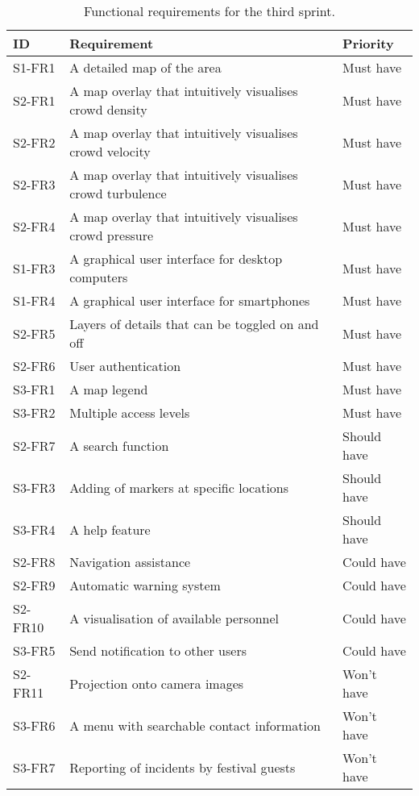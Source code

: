\begin{table}[h!]
	\centering
	\begin{tabularx}{\textwidth}{lXl}
		\toprule
		\textbf{ID} & \textbf{Requirement} & \textbf{Priority} \\
		\midrule 
		\rowcolor[HTML]{EFEFEF} 
		S1-FR1 & A detailed map of the area & Must have \\
		S2-FR1 & A map overlay that intuitively visualises crowd density & Must have \\
		\rowcolor[HTML]{EFEFEF} 
		S2-FR2 & A map overlay that intuitively visualises crowd velocity & Must have \\
		S2-FR3 & A map overlay that intuitively visualises crowd turbulence & Must have \\
		\rowcolor[HTML]{EFEFEF} 
		S2-FR4 & A map overlay that intuitively visualises crowd pressure & Must have \\
		S1-FR3 & A graphical user interface for desktop computers & Must have \\
		\rowcolor[HTML]{EFEFEF} 
		S1-FR4 & A graphical user interface for smartphones & Must have \\
		S2-FR5 & Layers of details that can be toggled on and off & Must have \\
		\rowcolor[HTML]{EFEFEF} 
		S2-FR6 & User authentication & Must have \\
		S3-FR1 & A map legend & Must have \\
		\rowcolor[HTML]{EFEFEF}
		S3-FR2 & Multiple access levels & Must have \\
		S2-FR7 & A search function & Should have \\
		\rowcolor[HTML]{EFEFEF}
		S3-FR3 & Adding of markers at specific locations & Should have \\
		S3-FR4 & A help feature & Should have \\
		\rowcolor[HTML]{EFEFEF} 
		S2-FR8 & Navigation assistance & Could have \\
		S2-FR9 & Automatic warning system & Could have \\
		\rowcolor[HTML]{EFEFEF} 
		S2-FR10 & A visualisation of available personnel & Could have \\
		S3-FR5 & Send notification to other users & Could have \\
		\rowcolor[HTML]{EFEFEF}
		S2-FR11 & Projection onto camera images & Won't have \\
		S3-FR6 & A menu with searchable contact information & Won't have \\
		\rowcolor[HTML]{EFEFEF}
		S3-FR7 & Reporting of incidents by festival guests & Won't have \\
		\bottomrule
	\end{tabularx}
	\caption{Functional requirements for the third sprint.}
	\label{tab:s3_req}
\end{table}

